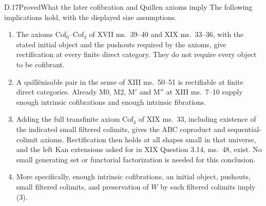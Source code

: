 \begin{result}{D.17}{Proved}{What the later cofibration and Quillen axioms imply}
The following implications hold, with the displayed size assumptions.
\begin{enumerate}
\item The axioms Cof$_0$--Cof$_3$ of XVII ms.~39--40 and XIX
      ms.~33--36, with the stated initial object and the pushouts
      required by the axioms, give rectification at every finite
      direct category. They do not require every object to be
      cofibrant.
\item A quill\'enisable pair in the sense of XIII ms.~50--51 is
      rectifiable at finite direct categories. Already M0, M2,
      M$'$ and M$''$ at XIII ms.~7--10 supply enough intrinsic
      cofibrations and enough intrinsic fibrations.
\item Adding the full transfinite axiom Cof$_4$ of XIX ms.~33,
      including existence of the indicated small filtered colimits,
      gives the ABC coproduct and sequential-colimit axioms.
      Rectification then holds at all shapes small in that universe,
      and the left Kan extensions asked for in XIX Question 3.14,
      ms.~48, exist. No small generating set or functorial
      factorization is needed for this conclusion.
\item More specifically, enough intrinsic cofibrations, an initial
      object, pushouts, small filtered colimits, and preservation of
      $W$ by such filtered colimits imply (3).
\end{enumerate}
\end{result}
